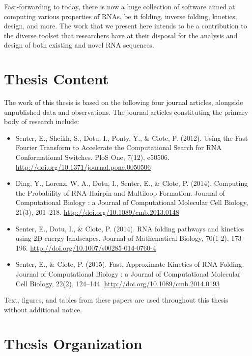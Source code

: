 \documentclass[11pt, oneside]{Thesis} %
\providecommand{\DIFdel}[1]{{\protect\color{red}\sout{#1}}}                      %
\providecommand{\DIFaddbegin}{} %
\providecommand{\DIFaddend}{} %
\providecommand{\DIFdelbegin}{} %
\providecommand{\DIFdelend}{} %
\begin{document}
Fast-forwarding to today, there is now a huge collection of software aimed at
computing various properties of RNAs, be it folding, inverse folding, kinetics,
design, and more. The work that we present here intends to be a contribution
to the diverse toolset that researchers have at their disposal for the analysis
and design of both existing and novel RNA sequences.

\section{Thesis Content}
\label{sec:intro:thesiscontent}

The work of this thesis is based on the following four journal articles, alongside
unpublished data and observations. The journal articles constituting the
primary body of research include:

\begin{itemize}
\item Senter, E., Sheikh, S., Dotu, I., Ponty, Y., \& Clote, P. (2012). Using the Fast Fourier Transform to Accelerate the Computational Search for RNA Conformational Switches. PloS One, 7(12), e50506. \url{http://doi.org/10.1371/journal.pone.0050506}
\item Ding, Y., Lorenz, W. A., Dotu, I., Senter, E., \& Clote, P. (2014). Computing the Probability of RNA Hairpin and Multiloop Formation. Journal of Computational Biology : a Journal of Computational Molecular Cell Biology, 21(3), 201–218. \url{http://doi.org/10.1089/cmb.2013.0148}
\item Senter, E., Dotu, I., \& Clote, P. (2014). RNA folding pathways and kinetics using \DIFdelbegin \DIFdel{2D }\DIFdelend \DIFaddbegin \twoD \DIFaddend energy landscapes. Journal of Mathematical Biology, 70(1-2), 173–196. \url{http://doi.org/10.1007/s00285-014-0760-4}
\item Senter, E., \& Clote, P. (2015). Fast, Approximate Kinetics of RNA Folding. Journal of Computational Biology : a Journal of Computational Molecular Cell Biology, 22(2), 124–144. \url{http://doi.org/10.1089/cmb.2014.0193}
\end{itemize}

Text, figures, and tables from these papers are used throughout this thesis without
additional notice.

\section{Thesis Organization}
\label{sec:intro:thesisorg}
\end{document}
